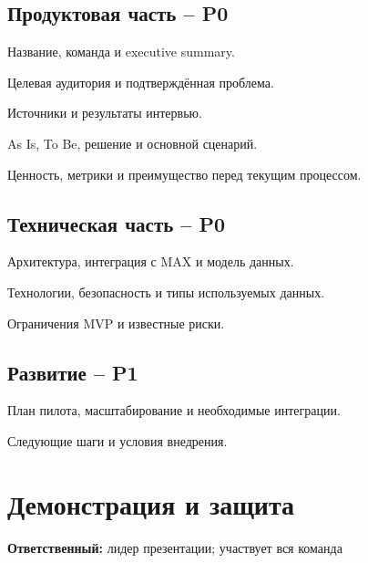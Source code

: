 \documentclass[11pt,a4paper]{article}
\newcommand{\PZero}{\textcolor{PZero}{\textbf{P0}}}
\newcommand{\POne}{\textcolor{POne}{\textbf{P1}}}
\newcommand{\owner}[1]{\textcolor{Muted}{\textbf{Ответственный:} #1}}
\begin{document}
\subsection{Продуктовая часть -- \PZero}
\begin{tasklist}
  \item Название, команда и executive summary.
  \item Целевая аудитория и подтверждённая проблема.
  \item Источники и результаты интервью.
  \item As Is, To Be, решение и основной сценарий.
  \item Ценность, метрики и преимущество перед текущим процессом.
\end{tasklist}

\subsection{Техническая часть -- \PZero}
\begin{tasklist}
  \item Архитектура, интеграция с MAX и модель данных.
  \item Технологии, безопасность и типы используемых данных.
  \item Ограничения MVP и известные риски.
\end{tasklist}

\subsection{Развитие -- \POne}
\begin{tasklist}
  \item План пилота, масштабирование и необходимые интеграции.
  \item Следующие шаги и условия внедрения.
\end{tasklist}

\section{Демонстрация и защита}
\owner{лидер презентации; участвует вся команда}
\end{document}
